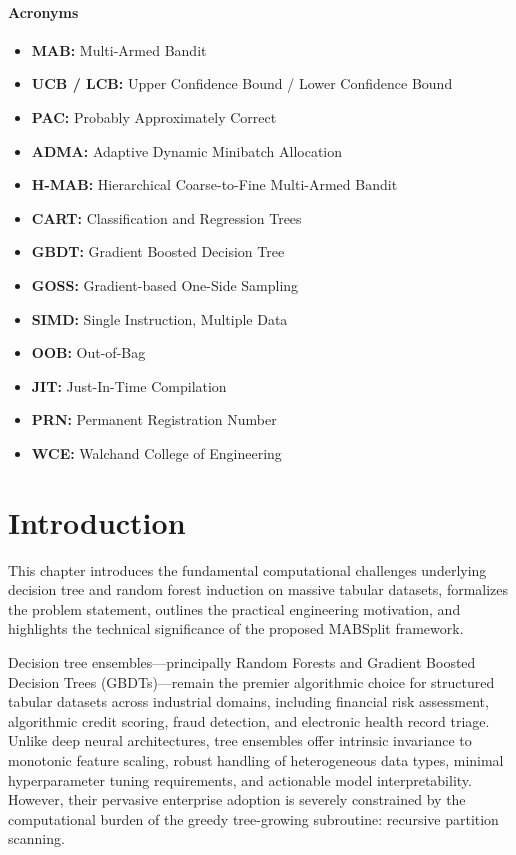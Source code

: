 \documentclass{article}
\begin{document}
	\vspace{0.8cm}
	\paragraph{\Large \textbf{Acronyms}}\nopagebreak
	\begin{itemize}
		\item \textbf{MAB:} Multi-Armed Bandit
		\item \textbf{UCB / LCB:} Upper Confidence Bound / Lower Confidence Bound
		\item \textbf{PAC:} Probably Approximately Correct
		\item \textbf{ADMA:} Adaptive Dynamic Minibatch Allocation
		\item \textbf{H-MAB:} Hierarchical Coarse-to-Fine Multi-Armed Bandit
		\item \textbf{CART:} Classification and Regression Trees
		\item \textbf{GBDT:} Gradient Boosted Decision Tree
		\item \textbf{GOSS:} Gradient-based One-Side Sampling
		\item \textbf{SIMD:} Single Instruction, Multiple Data
		\item \textbf{OOB:} Out-of-Bag
		\item \textbf{JIT:} Just-In-Time Compilation
		\item \textbf{PRN:} Permanent Registration Number
		\item \textbf{WCE:} Walchand College of Engineering
	\end{itemize}
		
	\pagebreak
	
	\section{Introduction}
	This chapter introduces the fundamental computational challenges underlying decision tree and random forest induction on massive tabular datasets, formalizes the problem statement, outlines the practical engineering motivation, and highlights the technical significance of the proposed MABSplit framework.
    
	Decision tree ensembles---principally Random Forests and Gradient Boosted Decision Trees (GBDTs)---remain the premier algorithmic choice for structured tabular datasets across industrial domains, including financial risk assessment, algorithmic credit scoring, fraud detection, and electronic health record triage. Unlike deep neural architectures, tree ensembles offer intrinsic invariance to monotonic feature scaling, robust handling of heterogeneous data types, minimal hyperparameter tuning requirements, and actionable model interpretability. However, their pervasive enterprise adoption is severely constrained by the computational burden of the greedy tree-growing subroutine: recursive partition scanning. 
\end{document}
